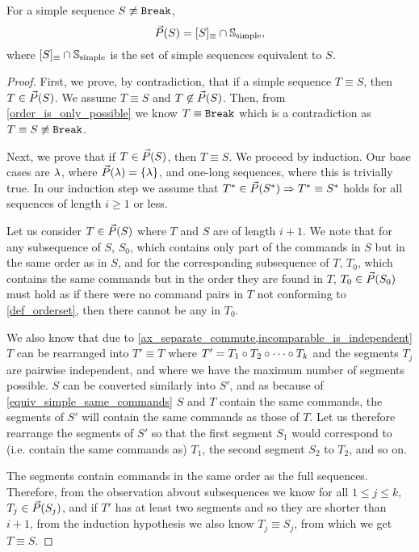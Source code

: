 \begin{mylem}\label{simple_reorder_equiv}
For a simple sequence $S\not\equiv\mathtt{Break}$,
\[ \vec{P}({S}) = [S]_\equiv \cap \mathbb{S}_{\mathrm{simple}}, \]
where $[S]_\equiv \cap \mathbb{S}_{\mathrm{simple}}$ is the set of simple sequences equivalent to $S$.
\end{mylem}
\begin{proof}
First, we prove, by contradiction, that if a simple sequence $T\equiv S$, then $T\in\vec{P}({S})$.
We assume $T\equiv S$ and $T\not\in\vec{P}({S})$.
Then, from \cref{order_is_only_possible} we know $T\equiv\mathtt{Break}$ which
is a contradiction as $T\equiv S\not\equiv\mathtt{Break}$.

Next, we prove that if $T\in\vec{P}({S})$, then $T\equiv S$.
We proceed by induction.
Our base cases are $\lambda$, where $\vec{P}({\lambda})=\{\lambda\}$,
and one-long sequences, where this is trivially true.
In our induction step we assume that $T^*\in\vec{P}({S^*})\Rightarrow T^*\equiv S^*$ holds
for all sequences of length $i\geq 1$ or less.

Let us consider $T\in\vec{P}({S})$ where $T$ and $S$ are of length $i+1$.
We note that for any subsequence of $S$, $S_0$, which contains
only part of the commands in $S$ but in the same order as in $S$,
and for the corresponding subsequence of $T$, $T_0$, which
contains the same commands but in the order they are found in $T$,
$T_0\in\vec{P}({S_0})$ must hold as
if there were no command pairs in $T$ not conforming to \cref{def_orderset},
then there cannot be any in $T_0$.

We also know that due to \cref{ax_separate_commute,incomparable_is_independent}
$T$ can be rearranged into $T'\equiv T$ where
$T'=T_1\circ T_2\circ \cdots \circ T_k$ and the segments $T_j$ are pairwise independent,
and where we have the maximum number of segments possible.
$S$ can be converted similarly into $S'$, and
as because of \cref{equiv_simple_same_commands} $S$ and $T$ contain the same commands,
the segments of $S'$ will contain the same commands as those of $T$.
Let us therefore rearrange the segments of $S'$ so that the first segment
$S_1$ would correspond to (i.e. contain the same commands as) $T_1$, the second segment $S_2$ to $T_2$,
and so on.

The segments contain commands in the same order as the full sequences.
Therefore, from the observation abvout subsequences
we know for all $1\leq j\leq k$, $T_j\in\vec{P}({S_j})$,
and if $T'$ has at least two segments and so 
they are shorter than $i+1$,
from the induction hypothesis
we also know $T_j\equiv S_j$, from which we get $T\equiv S$.


\end{proof}
